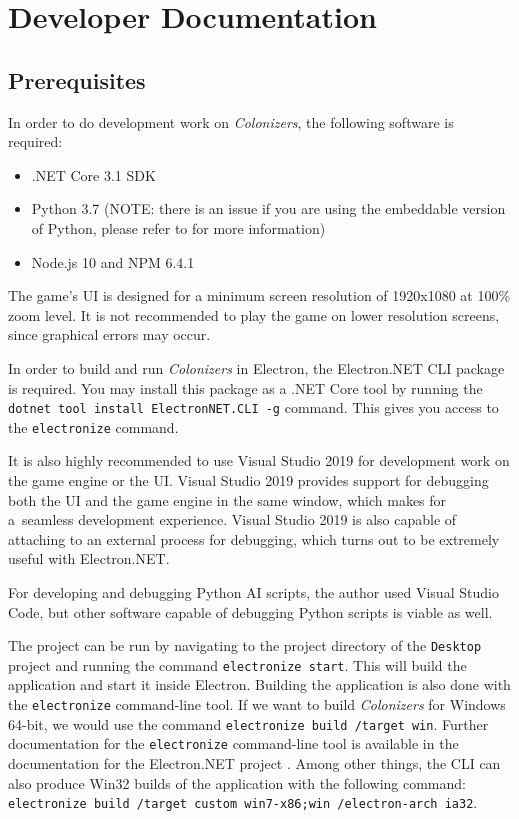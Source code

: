 \section{Developer Documentation}
\label{sec:devdocs} 

\subsection{Prerequisites}

In order to do development work on \emph{Colonizers}, the following software
is required:
\begin{itemize}
    \item .NET Core 3.1 SDK
    \item Python 3.7 (NOTE: there is an issue if you are using the embeddable
        version of Python, please refer to  for more information)
    \item Node.js 10 and NPM 6.4.1
\end{itemize}
The game's UI is designed for a minimum screen resolution of 1920x1080 at
100\% zoom level. It is not recommended to play the game on lower resolution
screens, since graphical errors may occur.

In order to build and run \emph{Colonizers} in Electron, the Electron.NET CLI
package is required. You may install this package as a .NET Core tool by running
the \texttt{dotnet tool install ElectronNET.CLI -g} command. This gives you
access to the \texttt{electronize} command.

It is also highly recommended to use Visual Studio 2019 for development work
on the game engine or the UI. Visual Studio 2019 provides support for debugging
both the UI and the game engine in the same window, which makes for a~seamless
development experience. Visual Studio 2019 is also capable of attaching
to an external process for debugging, which turns out to be
extremely useful with Electron.NET.

For developing and debugging Python AI scripts, the author used Visual Studio Code,
but other software capable of debugging Python scripts is viable as well.

The project can be run by navigating to the project directory of the \texttt{Desktop} project
and running the command \texttt{electronize start}. This will build the application
and start it inside Electron. Building the application is also done with the
\texttt{electronize} command-line tool. If we want to build \emph{Colonizers}
for Windows 64-bit, we would use the command \texttt{electronize build /target win}.
Further documentation for the \texttt{electronize} command-line tool
is available in the documentation for the Electron.NET project \cite{Electronnet}.
Among other things, the CLI can also produce Win32 builds of the application
with the following command:
\texttt{electronize build /target custom win7-x86;win /electron-arch ia32}.

